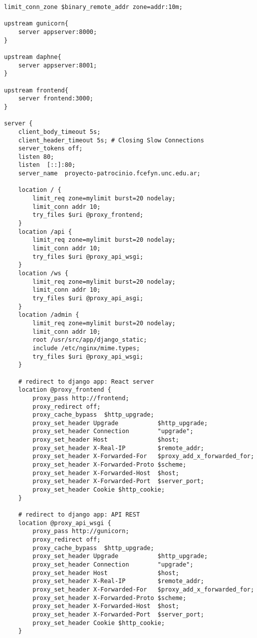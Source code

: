 \begin{lstlisting}[caption={Configuración de Nginx Reverse Proxy}, label={cod:nginx}, captionpos=b]
limit_conn_zone $binary_remote_addr zone=addr:10m;

upstream gunicorn{
    server appserver:8000;
}

upstream daphne{
    server appserver:8001;
}

upstream frontend{
    server frontend:3000;
}

server {
    client_body_timeout 5s;
    client_header_timeout 5s; # Closing Slow Connections
    server_tokens off;
    listen 80;
    listen  [::]:80;
    server_name  proyecto-patrocinio.fcefyn.unc.edu.ar;

    location / {
        limit_req zone=mylimit burst=20 nodelay;
        limit_conn addr 10;
        try_files $uri @proxy_frontend;
    }
    location /api {
        limit_req zone=mylimit burst=20 nodelay;
        limit_conn addr 10;
        try_files $uri @proxy_api_wsgi;
    }
    location /ws {
        limit_req zone=mylimit burst=20 nodelay;
        limit_conn addr 10;
        try_files $uri @proxy_api_asgi;
    }
    location /admin {
        limit_req zone=mylimit burst=20 nodelay;
        limit_conn addr 10;
        root /usr/src/app/django_static;
        include /etc/nginx/mime.types;
        try_files $uri @proxy_api_wsgi;
    }

    # redirect to django app: React server
    location @proxy_frontend {
        proxy_pass http://frontend;
        proxy_redirect off;
        proxy_cache_bypass  $http_upgrade;
        proxy_set_header Upgrade           $http_upgrade;
        proxy_set_header Connection        "upgrade";
        proxy_set_header Host              $host;
        proxy_set_header X-Real-IP         $remote_addr;
        proxy_set_header X-Forwarded-For   $proxy_add_x_forwarded_for;
        proxy_set_header X-Forwarded-Proto $scheme;
        proxy_set_header X-Forwarded-Host  $host;
        proxy_set_header X-Forwarded-Port  $server_port;
        proxy_set_header Cookie $http_cookie;
    }

    # redirect to django app: API REST
    location @proxy_api_wsgi {
        proxy_pass http://gunicorn;
        proxy_redirect off;
        proxy_cache_bypass  $http_upgrade;
        proxy_set_header Upgrade           $http_upgrade;
        proxy_set_header Connection        "upgrade";
        proxy_set_header Host              $host;
        proxy_set_header X-Real-IP         $remote_addr;
        proxy_set_header X-Forwarded-For   $proxy_add_x_forwarded_for;
        proxy_set_header X-Forwarded-Proto $scheme;
        proxy_set_header X-Forwarded-Host  $host;
        proxy_set_header X-Forwarded-Port  $server_port;
        proxy_set_header Cookie $http_cookie;
    }


\end{lstlisting}
